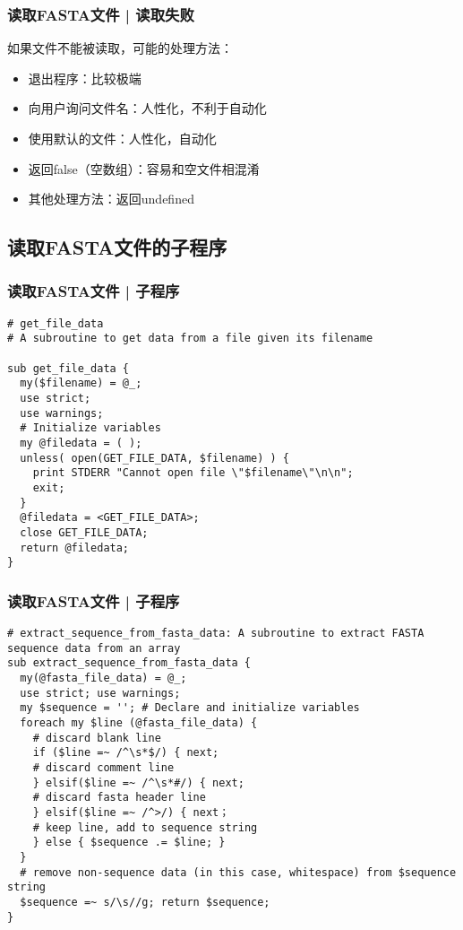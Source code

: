 \begin{frame}
  \frametitle{读取FASTA文件 | \alert{读取失败}}
  如果文件不能被读取，可能的处理方法：
  \begin{itemize}
    \item 退出程序：比较极端
    \item 向用户询问文件名：人性化，不利于自动化
    \item 使用默认的文件：人性化，自动化
    \item 返回false（空数组）：容易和空文件相混淆
    \item 其他处理方法：返回undefined
  \end{itemize}
\end{frame}

\subsection{读取FASTA文件的子程序}
\begin{frame}[fragile]
  \frametitle{读取FASTA文件 | 子程序}
\begin{lstlisting}[firstnumber=1,basicstyle=\footnotesize\tt,numberstyle=\scriptsize]
# get_file_data
# A subroutine to get data from a file given its filename

sub get_file_data {
  my($filename) = @_;
  use strict;
  use warnings;
  # Initialize variables
  my @filedata = ( );
  unless( open(GET_FILE_DATA, $filename) ) {
    print STDERR "Cannot open file \"$filename\"\n\n";
    exit;
  }
  @filedata = <GET_FILE_DATA>;
  close GET_FILE_DATA;
  return @filedata;
}
\end{lstlisting}
\end{frame}

\begin{frame}[fragile]
  \frametitle{读取FASTA文件 | 子程序}
  \vspace{-0.8em}
\begin{lstlisting}[firstnumber=31,basicstyle=\footnotesize\tt,numberstyle=\scriptsize]
# extract_sequence_from_fasta_data: A subroutine to extract FASTA sequence data from an array
sub extract_sequence_from_fasta_data {
  my(@fasta_file_data) = @_;
  use strict; use warnings;
  my $sequence = ''; # Declare and initialize variables
  foreach my $line (@fasta_file_data) {
    # discard blank line
    if ($line =~ /^\s*$/) { next;
    # discard comment line 
    } elsif($line =~ /^\s*#/) { next;
    # discard fasta header line
    } elsif($line =~ /^>/) { next；
    # keep line, add to sequence string
    } else { $sequence .= $line; }
  }
  # remove non-sequence data (in this case, whitespace) from $sequence string
  $sequence =~ s/\s//g; return $sequence;
}
\end{lstlisting}
\end{frame}

